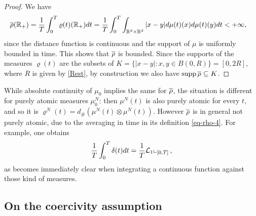 \begin{proof}
We have
\begin{align*}
\begin{split}
\overline\rho(\mathbb{R}_+)&= \frac{1}{T}\int_0^T \varrho(t)(\mathbb{R}_+)dt 
= \frac{1}{T}\int_0^T \int_{\mathbb{R}^d \times \mathbb{R}^d} |x - y| d\mu(t)(x) d \mu(t)(y)dt
<+\infty,
\end{split}
\end{align*}
since the distance function is continuous and the support of $\mu$ is uniformly bounded in time. This shows that $\overline\rho$ is bounded.
Since the supports of the measures $\varrho(t)$ are the subsets of
$K=\{|x-y|:x,y\in B(0,R)\} = [0,2R]$, where $R$ is given by \eqref{Rest}, by construction we also have $\operatorname{supp} \overline\rho\subseteq K$.
\end{proof}

\begin{remark}
	While absolute continuity of $\mu_0$ implies the same for $\overline\rho$, the situation is different for purely atomic
	measures $\mu_0^N$: then $\mu^N(t)$ is also purely atomic for every $t$, and so it is
	$\varrho^N(t) = d_\# (\mu^N(t) \otimes \mu^N(t))$. However $\overline\rho$ is in general not purely atomic, due to the averaging in time in its definition \eqref{eq-rho-4}. 
	For
	example, one obtains
	\begin{align*}
		\frac{1}{T}\int_0^T\delta(t) dt=\frac{1}{T}\mathcal{L}_1\llcorner_{[0,T]}\,,
	\end{align*}
	as becomes immediately clear when integrating a continuous function against those kind of measures.
\end{remark}


\subsection{On the coercivity assumption}\label{sec:coerc}

